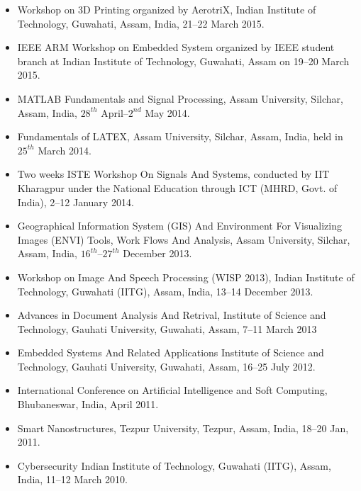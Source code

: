 \documentclass[10pt]{article}
\begin{document}
\begin{itemize}
\item Workshop on 3D Printing organized by   AerotriX, Indian   Institute of Technology, Guwahati, Assam, India, 21--22 March 2015.

\item IEEE   ARM Workshop on Embedded System organized by   IEEE student branch at Indian Institute of Technology, Guwahati, Assam on 19--20 March 2015.


\item MATLAB Fundamentals and Signal Processing, Assam University, Silchar, Assam, India, $28^{th}$ April--$2^{nd}$ May 2014.

\item Fundamentals of LATEX, Assam University, Silchar, Assam, India, held in $25^{th}$ March 2014.

\item Two weeks ISTE Workshop On  Signals And Systems, conducted by IIT Kharagpur under the National Education through ICT   (MHRD,   Govt.   of   India), 2--12 January 2014.


\item Geographical Information System (GIS) And Environment For Visualizing Images (ENVI) Tools, Work Flows And Analysis, Assam University, Silchar, Assam, India, $16^{th}$--$27^{th}$   December 2013.

\item Workshop on Image And Speech Processing (WISP 2013), Indian Institute of Technology, Guwahati (IITG), Assam, India, 13--14 December 2013.

\item Advances in Document Analysis And Retrival, Institute of Science  and Technology,   Gauhati   University,   Guwahati, Assam, 7--11 March 2013 


\item Embedded   Systems  And  Related   Applications  Institute of Science and Technology, Gauhati University, Guwahati, Assam, 16--25 July 2012.

\item International Conference on Artificial Intelligence and Soft   Computing, Bhubaneswar, India, April 2011.

\item Smart Nanostructures, Tezpur University, Tezpur, Assam, India, 18--20 Jan, 2011.

\item Cybersecurity Indian   Institute of Technology, Guwahati (IITG), Assam, India, 11--12 March 2010.


\end{itemize}
\end{document}

